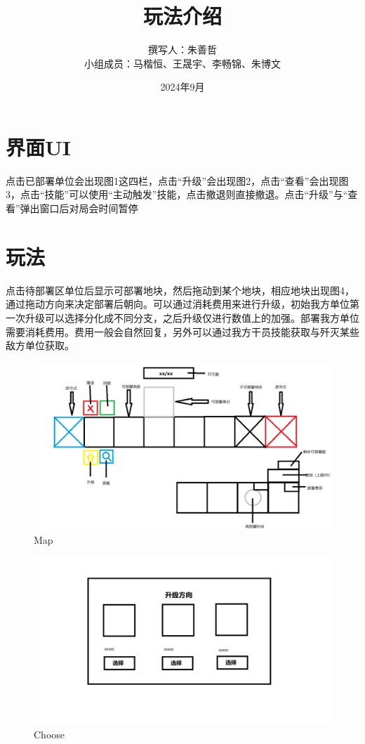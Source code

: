 \documentclass[a4paper,12pt]{article}
\begin{document}
	\title{玩法介绍}
	\author{撰写人：朱善哲\\小组成员：马楷恒、王晟宇、李畅锦、朱博文}
	\date{2024年9月}
	\maketitle
	\section{界面UI}
		
		点击已部署单位会出现图1这四栏，点击“升级”会出现图2，点击“查看”会出现图3，点击“技能”可以使用“主动触发”技能，点击撤退则直接撤退。点击“升级”与“查看”弹出窗口后对局会时间暂停
	\section{玩法}
		点击待部署区单位后显示可部署地块，然后拖动到某个地块，相应地块出现图4，通过拖动方向来决定部署后朝向。可以通过消耗费用来进行升级，初始我方单位第一次升级可以选择分化成不同分支，之后升级仅进行数值上的加强。部署我方单位需要消耗费用。费用一般会自然回复，另外可以通过我方干员技能获取与歼灭某些敌方单位获取。
	\begin{figure}[p]
		\centering
		\includegraphics[width=1\textwidth]{map_intro}
		\caption{Map}
	\end{figure}
	\begin{figure}[p]
		\centering
		\includegraphics[width=1\textwidth]{choose}
		\caption{Choose}
	\end{figure}
\end{document}
